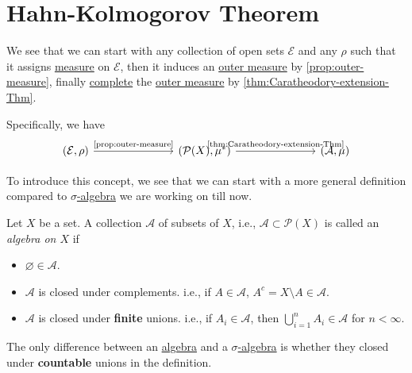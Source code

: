 \section{Hahn-Kolmogorov Theorem}
We see that we can start with any collection of open sets \(\mathcal{E}\) and any \(\rho\) such that it assigns \hyperref[def:measure]{measure} on \(\mathcal{E}\), then it induces an
\hyperref[def:outer-measure]{outer measure} by \autoref{prop:outer-measure}, finally \hyperref[def:complete-measure-space]{complete} the \hyperref[def:outer-measure]{outer measure} by \autoref{thm:Caratheodory-extension-Thm}.

Specifically, we have
\[
	\begin{tikzcd}
		(\mathcal{E}, \rho) \ar[rrr, "\text{\autoref{prop:outer-measure}}"] &&& (\mathcal{P}(X), \mu^{*} ) \ar[rrr, "\text{\autoref{thm:Caratheodory-extension-Thm}}"] &&& (\mathcal{A} , \mu)
	\end{tikzcd}
\]

\par To introduce this concept, we see that we can start with a more general definition compared to \hyperref[def:sigma-algebra]{\(\sigma\)-algebra} we are working on till now.
\begin{definition}[Algebra]\label{def:algebra}
	Let \(X\) be a set. A collection \(\mathcal{A} \) of subsets of \(X\), i.e., \(\mathcal{A}\subset \mathcal{P} (X) \) is called an \emph{algebra on \(X\)} if
	\begin{itemize}
		\item \(\varnothing \in \mathcal{A} \).
		\item \(\mathcal{A} \) is closed under complements. i.e., if \(A\in \mathcal{A} \), \(A^c = X\setminus A\in \mathcal{A} \).
		\item \(\mathcal{A} \) is closed under \textbf{finite} unions. i.e., if \(A_i\in \mathcal{A} \), then \(\bigcup\limits_{i=1}^{n} A_{i}\in \mathcal{A} \) for \(n<\infty \).
	\end{itemize}
\end{definition}
\begin{remark}
	The only difference between an \hyperref[def:algebra]{algebra} and a \hyperref[def:sigma-algebra]{\(\sigma\)-algebra} is whether they closed under \textbf{countable} unions in the definition.
\end{remark}

